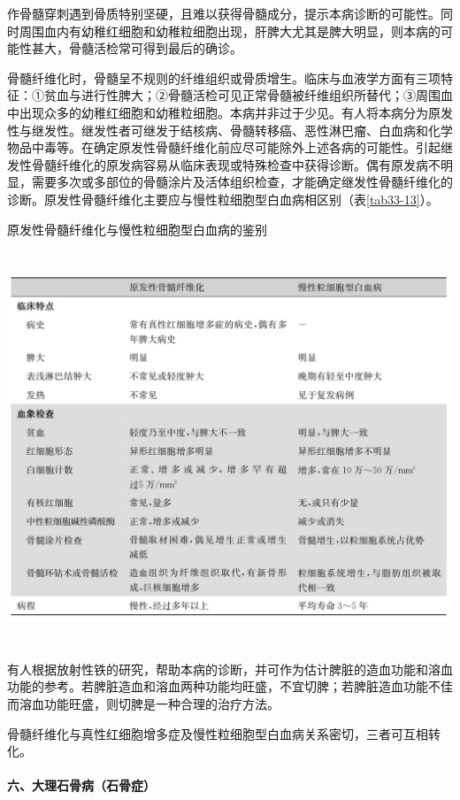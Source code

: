 作骨髓穿刺遇到骨质特别坚硬，且难以获得骨髓成分，提示本病诊断的可能性。同时周围血内有幼稚红细胞和幼稚粒细胞出现，肝脾大尤其是脾大明显，则本病的可能性甚大，骨髓活检常可得到最后的确诊。

骨髓纤维化时，骨髓呈不规则的纤维组织或骨质增生。临床与血液学方面有三项特征：①贫血与进行性脾大；②骨髓活检可见正常骨髓被纤维组织所替代；③周围血中出现众多的幼稚红细胞和幼稚粒细胞。本病并非过于少见。有人将本病分为原发性与继发性。继发性者可继发于结核病、骨髓转移癌、恶性淋巴瘤、白血病和化学物品中毒等。在确定原发性骨髓纤维化前应尽可能除外上述各病的可能性。引起继发性骨髓纤维化的原发病容易从临床表现或特殊检查中获得诊断。偶有原发病不明显，需要多次或多部位的骨髓涂片及活体组织检查，才能确定继发性骨髓纤维化的诊断。原发性骨髓纤维化主要应与慢性粒细胞型白血病相区别（表\ref{tab33-13}）。

\begin{table}[htbp]
\centering
\caption{原发性骨髓纤维化与慢性粒细胞型白血病的鉴别}
\label{tab33-13}
\includegraphics[width=5.95833in,height=4.63542in]{./images/Image00190.jpg}
\end{table}

有人根据放射性铁的研究，帮助本病的诊断，并可作为估计脾脏的造血功能和溶血功能的参考。若脾脏造血和溶血两种功能均旺盛，不宜切脾；若脾脏造血功能不佳而溶血功能旺盛，则切脾是一种合理的治疗方法。

骨髓纤维化与真性红细胞增多症及慢性粒细胞型白血病关系密切，三者可互相转化。

\paragraph{六、大理石骨病（石骨症）}

